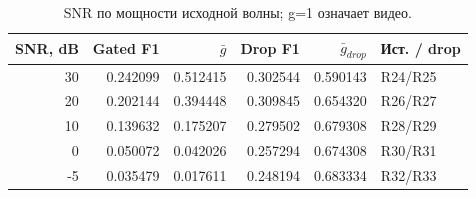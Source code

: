 \begin{table}[H]\centering\footnotesize
\setlength{\tabcolsep}{4pt}
\caption{SNR по мощности исходной волны; g=1 означает видео.}\label{tab:noise}
\begin{tabular}{rrrrrl}
\toprule
SNR, dB & Gated F1 & $\bar g$ & Drop F1 & $\bar g_{drop}$ & Ист. / drop \\
\midrule
30 & 0.242099 & 0.512415 & 0.302544 & 0.590143 & R24/R25 \\
20 & 0.202144 & 0.394448 & 0.309845 & 0.654320 & R26/R27 \\
10 & 0.139632 & 0.175207 & 0.279502 & 0.679308 & R28/R29 \\
0 & 0.050072 & 0.042026 & 0.257294 & 0.674308 & R30/R31 \\
-5 & 0.035479 & 0.017611 & 0.248194 & 0.683334 & R32/R33 \\
\bottomrule
\end{tabular}
\end{table}
